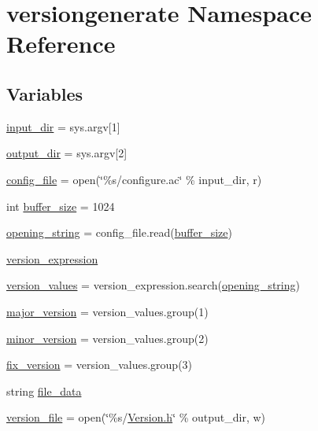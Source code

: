 \hypertarget{namespaceversiongenerate}{}\section{versiongenerate Namespace Reference}
\label{namespaceversiongenerate}
\subsection*{Variables}
\begin{DoxyCompactItemize}
\item 
\hyperlink{namespaceversiongenerate_a68af424183a162a61507cdc378cf255e}{input\+\_\+dir} = sys.\+argv\mbox{[}1\mbox{]}
\item 
\hyperlink{namespaceversiongenerate_aab714e0aa9036025ba7c83eb7422c567}{output\+\_\+dir} = sys.\+argv\mbox{[}2\mbox{]}
\item 
\hyperlink{namespaceversiongenerate_afdfd8d6de9b62e742923b2b3326798e6}{config\+\_\+file} = open(\char`\"{}\%s/configure.\+ac\char`\"{} \% input\+\_\+dir, \textquotesingle{}r\textquotesingle{})
\item 
int \hyperlink{namespaceversiongenerate_a5656c48d43f7e869041b6a30c124702e}{buffer\+\_\+size} = 1024
\item 
\hyperlink{namespaceversiongenerate_a88cc36d80d757546e04817490ebb0640}{opening\+\_\+string} = config\+\_\+file.\+read(\hyperlink{namespaceversiongenerate_a5656c48d43f7e869041b6a30c124702e}{buffer\+\_\+size})
\item 
\hyperlink{namespaceversiongenerate_a83861e707250395976fdfee3396a0fff}{version\+\_\+expression}
\item 
\hyperlink{namespaceversiongenerate_a0ce22d4ba772e519b000413a3bf5445c}{version\+\_\+values} = version\+\_\+expression.\+search(\hyperlink{namespaceversiongenerate_a88cc36d80d757546e04817490ebb0640}{opening\+\_\+string})
\item 
\hyperlink{namespaceversiongenerate_a4b536109523f1bc805806f8d76ca34ac}{major\+\_\+version} = version\+\_\+values.\+group(1)
\item 
\hyperlink{namespaceversiongenerate_af8027cbccfcda6a243f0544cc3c08b28}{minor\+\_\+version} = version\+\_\+values.\+group(2)
\item 
\hyperlink{namespaceversiongenerate_aa92fb32c5f03f516f3b6224c620b66e4}{fix\+\_\+version} = version\+\_\+values.\+group(3)
\item 
string \hyperlink{namespaceversiongenerate_aa7a8a587902d8dc493945992ec3fcf60}{file\+\_\+data}
\item 
\hyperlink{namespaceversiongenerate_a3cb3deeb1538014cd32e4253fe298e27}{version\+\_\+file} = open(\char`\"{}\%s/\hyperlink{defines__3_8js_ae2a90576a00c74b62070401964c54a5d}{Version.\+h}\char`\"{} \% output\+\_\+dir, \textquotesingle{}w\textquotesingle{})
\end{DoxyCompactItemize}


